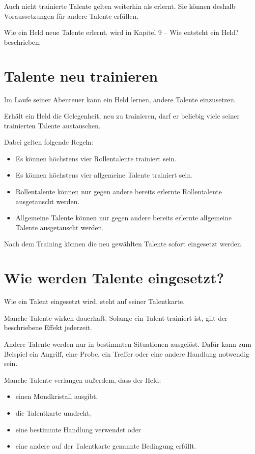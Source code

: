 Auch nicht trainierte Talente gelten weiterhin als erlernt. Sie können deshalb Voraussetzungen für andere Talente erfüllen.

Wie ein Held neue Talente erlernt, wird in Kapitel 9 -- Wie entsteht ein Held? beschrieben.

\section{Talente neu trainieren}

Im Laufe seiner Abenteuer kann ein Held lernen, andere Talente einzusetzen.

Erhält ein Held die Gelegenheit, neu zu trainieren, darf er beliebig viele seiner trainierten Talente austauschen.

Dabei gelten folgende Regeln:

\begin{itemize}
  \item Es können höchstens vier Rollentalente trainiert sein.
  \item Es können höchstens vier allgemeine Talente trainiert sein.
  \item Rollentalente können nur gegen andere bereits erlernte Rollentalente ausgetauscht werden.
  \item Allgemeine Talente können nur gegen andere bereits erlernte allgemeine Talente ausgetauscht werden.
\end{itemize}

Nach dem Training können die neu gewählten Talente sofort eingesetzt werden.

\section{Wie werden Talente eingesetzt?}

Wie ein Talent eingesetzt wird, steht auf seiner Talentkarte.

Manche Talente wirken dauerhaft. Solange ein Talent trainiert ist, gilt der beschriebene Effekt jederzeit.

Andere Talente werden nur in bestimmten Situationen ausgelöst. Dafür kann zum Beispiel ein Angriff, eine Probe, ein Treffer oder eine andere Handlung notwendig sein.

Manche Talente verlangen außerdem, dass der Held:

\begin{itemize}
  \item einen Mondkristall ausgibt,
  \item die Talentkarte umdreht,
  \item eine bestimmte Handlung verwendet oder
  \item eine andere auf der Talentkarte genannte Bedingung erfüllt.
\end{itemize}

